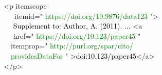 \raggedright\small\bgroup\ttfamily\frenchspacing
<p \textcolor{dccblue}{itemscope\\~~~itemid="}%
\textcolor{Green}{https://doi.org/10.9876/data123}%
\textcolor{dccblue}{"}>\\~~%
\textcolor{black}{Supplement to: Author, A. (2011). ... }<a\\~~%
\textcolor{dccblue}{href="}%
\textcolor{Green}{https://doi.org/10.123/paper45}%
\textcolor{dccblue}{"\\~~itemprop="}%
\textcolor{Green}{http://purl.org/spar/cito/\\~~providesDataFor}%
\textcolor{dccblue}{"}%
>\textcolor{black}{doi:10.123/paper45}</a>\\</p>\egroup

